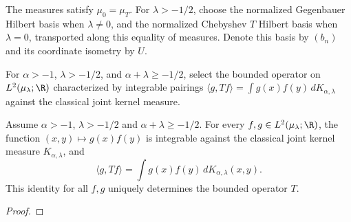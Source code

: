 \begin{supporting}
\begin{definition}
\label{def:power-law-full-basis}
\leanok
The measures satisfy $\mu_0=\mu_T$. For $\lambda>-1/2$, choose the
normalized Gegenbauer Hilbert basis when $\lambda\ne0$, and the
normalized Chebyshev $T$ Hilbert basis when $\lambda=0$, transported along
this equality of measures. Denote this basis by $(b_n)$ and its coordinate
isometry by $U$.
\end{definition}


\begin{definition}
\label{def:power-law-full-realization}
\leanok
For $\alpha>-1$, $\lambda>-1/2$, and $\alpha+\lambda\ge-1/2$, select the
bounded operator on $L^2(\mu_\lambda;\R)$ characterized by integrable pairings
$\langle g,Tf\rangle=\int g(x)f(y)\,dK_{\alpha,\lambda}$ against the classical
joint kernel measure.
\end{definition}
\begin{theorem}
\label{thm:power-law-full-characterisation}
\leanok
Assume $\alpha>-1$, $\lambda>-1/2$ and $\alpha+\lambda\ge-1/2$. For every $f,g\in L^2(\mu_\lambda;\R)$,
the function $(x,y)\mapsto g(x)f(y)$ is integrable against the classical
joint kernel measure $K_{\alpha,\lambda}$, and
\[
 \langle g,Tf\rangle=\int g(x)f(y)\,dK_{\alpha,\lambda}(x,y).
\]
This identity for all $f,g$ uniquely determines the bounded operator $T$.
\end{theorem}
\begin{proof}
\leanok
\end{proof}


\end{supporting}
